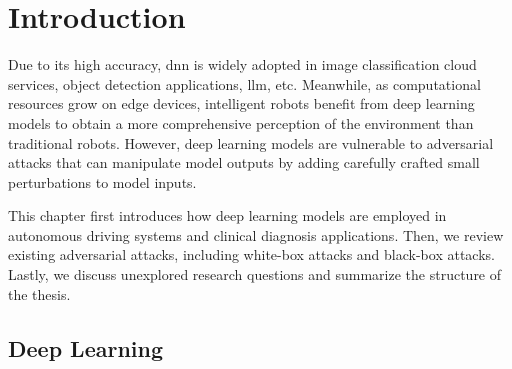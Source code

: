 \chapter{Introduction}
\label{chpt:intro}

Due to its high accuracy, \acrfull{dnn} is widely adopted in image classification cloud services, object detection applications, \acrfull{llm}, etc. Meanwhile, as computational resources grow on edge devices, intelligent robots benefit from deep learning models to obtain a more comprehensive perception of the environment than traditional robots. However, deep learning models are vulnerable to adversarial attacks that can manipulate model outputs by adding carefully crafted small perturbations to model inputs.

This chapter first introduces how deep learning models are employed in autonomous driving systems and clinical diagnosis applications. Then, we review existing adversarial attacks, including white-box attacks and black-box attacks. Lastly, we discuss unexplored research questions and summarize the structure of the thesis.




\section{Deep Learning}
\label{sec:deep_learning}



